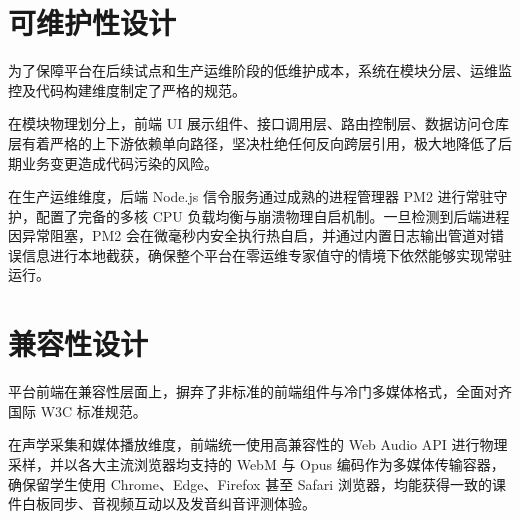 \section{可维护性设计}
为了保障平台在后续试点和生产运维阶段的低维护成本，系统在模块分层、运维监控及代码构建维度制定了严格的规范。

在模块物理划分上，前端 UI 展示组件、接口调用层、路由控制层、数据访问仓库层有着严格的上下游依赖单向路径，坚决杜绝任何反向跨层引用，极大地降低了后期业务变更造成代码污染的风险。

在生产运维维度，后端 Node.js 信令服务通过成熟的进程管理器 PM2 进行常驻守护，配置了完备的多核 CPU 负载均衡与崩溃物理自启机制。一旦检测到后端进程因异常阻塞，PM2 会在微毫秒内安全执行热自启，并通过内置日志输出管道对错误信息进行本地截获，确保整个平台在零运维专家值守的情境下依然能够实现常驻运行。

\section{兼容性设计}
平台前端在兼容性层面上，摒弃了非标准的前端组件与冷门多媒体格式，全面对齐国际 W3C 标准规范。

在声学采集和媒体播放维度，前端统一使用高兼容性的 Web Audio API 进行物理采样，并以各大主流浏览器均支持的 WebM 与 Opus 编码作为多媒体传输容器，确保留学生使用 Chrome、Edge、Firefox 甚至 Safari 浏览器，均能获得一致的课件白板同步、音视频互动以及发音纠音评测体验。
